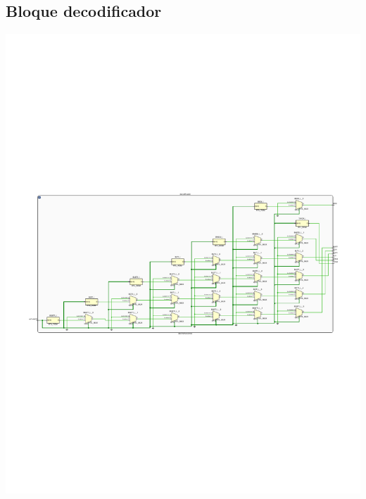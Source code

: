 \documentclass[8pt,executivepaper]{article}
\begin{document}
\subsection{Bloque decodificador}
\begin{center}
  \includegraphics[scale=0.75]{rtl/deco.pdf}
\end{center}
\end{document}

